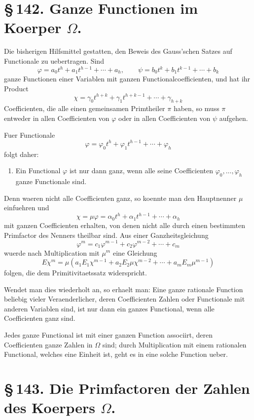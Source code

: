 \documentclass[11pt]{article}
\begin{document}
\section*{\S\,142. Ganze Functionen im Koerper \(\Omega\).}

Die bisherigen Hilfsmittel gestatten, den Beweis des Gauss'schen
Satzes auf Functionale zu uebertragen. Sind
\[
\varphi=a_0t^h+a_1t^{h-1}+\cdots+a_h,\qquad
\psi=b_0t^k+b_1t^{k-1}+\cdots+b_k
\]
ganze Functionen einer Variablen mit ganzen Functionalcoefficienten,
und hat ihr Product
\[
\chi=\gamma_0t^{h+k}+\gamma_1t^{h+k-1}+\cdots+\gamma_{h+k}
\]
Coefficienten, die alle einen gemeinsamen Primtheiler \(\pi\) haben,
so muss \(\pi\) entweder in allen Coefficienten von \(\varphi\) oder
in allen Coefficienten von \(\psi\) aufgehen.

Fuer Functionale
\[
\varphi=\varphi_0t^h+\varphi_1t^{h-1}+\cdots+\varphi_h
\tag{1}
\]
folgt daher:
\begin{enumerate}[label=\arabic*.]
\item Ein Functional \(\varphi\) ist nur dann ganz, wenn alle seine
Coefficienten \(\varphi_0,\ldots,\varphi_h\) ganze Functionale sind.
\end{enumerate}
Denn waeren nicht alle Coefficienten ganz, so koennte man den
Hauptnenner \(\mu\) einfuehren und
\[
\chi=\mu\varphi=\alpha_0t^h+\alpha_1t^{h-1}+\cdots+\alpha_h
\tag{2}
\]
mit ganzen Coefficienten erhalten, von denen nicht alle durch einen
bestimmten Primfactor des Nenners theilbar sind. Aus einer
Ganzheitsgleichung
\[
\varphi^m=c_1\varphi^{m-1}+c_2\varphi^{m-2}+\cdots+c_m
\tag{3}
\]
wuerde nach Multiplication mit \(\mu^m\) eine Gleichung
\[
E\chi^m=\mu(a_1E_1\chi^{m-1}+a_2E_2\mu\chi^{m-2}+\cdots+a_mE_m\mu^{m-1})
\tag{4}
\]
folgen, die dem Primitivitaetssatz widerspricht.

Wendet man dies wiederholt an, so erhaelt man: Eine ganze rationale
Function beliebig vieler Veraenderlicher, deren Coefficienten Zahlen
oder Functionale mit anderen Variablen sind, ist nur dann ein ganzes
Functional, wenn alle Coefficienten ganz sind.

Jedes ganze Functional ist mit einer ganzen Function associirt, deren
Coefficienten ganze Zahlen in \(\Omega\) sind; durch Multiplication
mit einem rationalen Functional, welches eine Einheit ist, geht es in
eine solche Function ueber.

\section*{\S\,143. Die Primfactoren der Zahlen des Koerpers \(\Omega\).}
\end{document}
